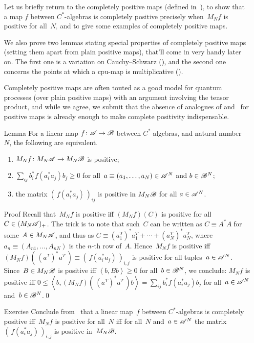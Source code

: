 \documentclass[a]{subfiles}
\begin{document}
\begin{parsec}%
\begin{point}%
Let us briefly return
to the completely positive maps (defined in~),
to show that a map $f$ between $C^*$-algebras
is completely positive precisely
when~$M_Nf$ is positive for all~$N$,
and to give some examples of completely positive maps.

We also prove two lemmas
stating special properties of completely positive maps (setting
them apart from plain positive maps),
that'll come in very handy later on.
The first one is a variation on Cauchy--Schwarz
(),
and the second one concerns
the points at which a cpu-map is multiplicative ().

Completely positive maps are often touted as 
a good model for quantum processes
(over plain positive maps)
with an argument involving the tensor product,
and while we agree,
we submit that the absence of analogues of  and~
for positive maps
is already enough to make complete positivity indispensable.
\end{point}
\begin{point}[n-pos]{Lemma}%
For a linear map $f\colon \mathscr{A}\to\mathscr{B}$
between $C^*$-algebras,
and natural number~$N$,
the following are equivalent.
\begin{enumerate}
\item
\label{n-pos-1}
$M_Nf\colon M_N\mathscr{A}\to M_N\mathscr{B}$
is positive;
\item
\label{n-pos-2}
	$\sum_{ij} b^*_if(a^*_ia_j)b_j \geq 0$
	for all~$a\equiv(a_1,\dotsc,a_N)\in \mathscr{A}^N$
	and $b\in \mathscr{B}^N$;
\item
\label{n-pos-3}
the matrix $(\,f(a_i^*a_j)\,)_{ij}$
is positive in $M_N\mathscr{B}$ for all $a\in\mathscr{A}^N$.
\end{enumerate}
\begin{point}{Proof}%
Recall that~$M_Nf$ is positive
iff $(M_Nf)(C)$ is positive for all $C\in (M_N\mathscr{A})_{+}$.
The trick is to note that such~$C$ can be written as $C\equiv A^*A$
for some~$A\in M_N\mathscr{A}$,
and thus as $C \equiv (a_1^T)^* a_1^T+\dotsb+(a_N^T)^*a_N^T$,
where $a_n\equiv(A_{n1},\dotsc,A_{nN})$ is the $n$-th row of~$A$.
Hence~$M_Nf$ is positive
iff $(M_Nf)(\,(a^T)^*a^T\, )\equiv(\,f(a_i^*a_j)\,)_{i,j}$ is positive
for all tuples~$a\in\mathscr{A}^N$.
Since~$B\in M_N\mathscr{B}$ is positive iff $\left<b,Bb\right>\geq 0$
for all~$b\in \mathscr{B}^N$,
we conclude:
$M_Nf$ is positive iff 
$0\leq\left<b,(M_Nf)(\, (a^T)^*a^T\,) b\right>
= \sum_{ij} b_i^*f(a_i^*a_j)b_j$
for all~$a\in\mathscr{A}^N$ and~$b\in\mathscr{B}^N$.\qed
\end{point}
\end{point}
\begin{point}[cp]{Exercise}%
Conclude from~
that a linear map~$f$ between $C^*$-algebras
is completely positive iff~$M_Nf$ is positive for all~$N$
iff 
for all~$N$ and~$a\in \mathscr{A}^N$
the matrix $(\,f(a_i^*a_j)\,)_{i,j}$ 
is positive in~$M_N\mathscr{B}$.


\end{point}
\end{parsec}
\end{document}

